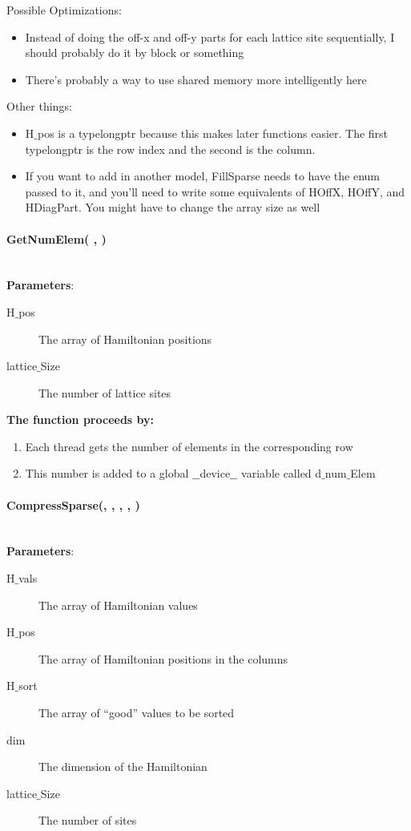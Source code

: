 \documentclass{article}
\begin{document}
Possible Optimizations:
\begin{itemize}
\item{Instead of doing the off-x and off-y parts for each lattice site sequentially, I should probably do it by block or something}
\item{There's probably a way to use shared memory more intelligently here}
\end{itemize}

Other things:
\begin{itemize}
\item{H$\_$pos is a typelongptr because this makes later functions easier. The first typelongptr is the row index and the second is the column.}
\item{If you want to add in another model, FillSparse needs to have the enum passed to it, and you'll need to write some equivalents of HOffX, HOffY, and HDiagPart. You might have to change the array size as well}
\end{itemize}

\paragraph{\cudaglobal \void GetNumElem( \typelongtwoptr , \int ) \\ \\}
\noindent\textbf{Parameters}:
\begin{description}
\item[\typelongtwoptr H$\_$pos] The array of Hamiltonian positions
\item[\int lattice$\_$Size] The number of lattice sites
\end{description}

\noindent\textbf{The function proceeds by:}
\begin{enumerate}
\item{Each thread gets the number of elements in the corresponding row}
\item{This number is added to a global $\_\_$device$\_\_$ variable called d$\_$num$\_$Elem}
\end{enumerate}

\paragraph{\cudaglobal \void CompressSparse(\cuDoubleComplex , \typelongtwoptr , \hamstruct , \int , \const \int ) \\ \\}
\noindent\textbf{Parameters}:
\begin{description}
\item[\cuDoubleComplex H$\_$vals] The array of Hamiltonian values
\item[\typelongtwoptr H$\_$pos] The array of Hamiltonian positions in the columns
\item[\hamstruct H$\_$sort] The array of ``good'' values to be sorted
\item[\long dim] The dimension of the Hamiltonian
\item[\int lattice$\_$Size] The number of sites
\end{description}
\end{document}

